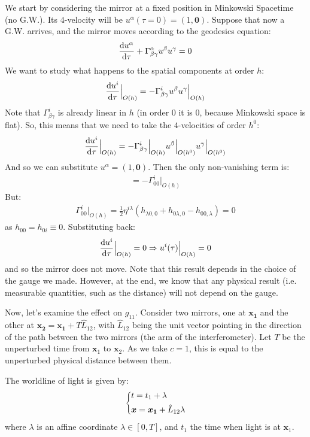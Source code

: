 \documentclass[../template.tex]{subfiles}
\begin{document}
We start by considering the mirror at a fixed position in Minkowski Spacetime (no G.W.). Its $4$-velocity will be $u^\alpha (\tau=0) = (1,\bm{0})$. Suppose that now a G.W. arrives, and the mirror moves according to the geodesics equation:
\begin{align*}
    \dv{u^\alpha}{\tau} + \Gamma^\alpha_{\beta \gamma} u^\beta u^\gamma = 0
\end{align*}
We want to study what happens to the spatial components at order $h$:
\begin{align*}
    \dv{u^i}{\tau}\Big|_{O(h)} = - \Gamma^i_{\beta \gamma}u^\beta u^\gamma \Big|_{O(h)}
\end{align*}
Note that $\Gamma^i_{\beta \gamma}$ is already linear in $h$ (in order $0$ it is $0$, because Minkowski space is flat). So, this means that we need to take the $4$-velocities of order $h^0$:
\begin{align*}
    \dv{u^i}{\tau}\Big|_{O(h)} = -\Gamma^i_{\beta \gamma}\Big|_{O(h)} u^\beta \Big|_{O(h^0)} u^\gamma \Big|_{O(h^0)}
\end{align*}
And so we can substitute $u^\alpha = (1,\bm{0})$. Then the only non-vanishing term is:
\begin{align*}
    = - \Gamma_{00}^i \Big|_{O(h)}
\end{align*}
But:
\begin{align*}
    \Gamma^i_{00} \Big|_{O(h)} = \frac{1}{2} \eta^{i \lambda} (h_{\lambda 0,0} + h_{0 \lambda,0}  - h_{00,\lambda}) = 0 
\end{align*}
as $h_{00} = h_{0i} \equiv 0$. Substituting back:
\begin{align*}
    \dv{u^i}{\tau}\Big|_{O(h)} = 0 \Rightarrow u^i(\tau) \Big|_{O(h)} = 0
\end{align*}
and so the mirror does not move. Note that this result depends in the choice of the gauge we made. However, at the end, we know that any physical result (i.e. measurable quantities, such as the distance) will not depend on the gauge.

\medskip

Now, let's examine the effect on $g_{11}$. Consider two mirrors, one at $\bm{x_1 }$ and the other at $\bm{x_2 } = \bm{x_1 } + T \hat{L}_{12}$, with $\hat{L}_{12}$ being the unit vector pointing in the direction of the path between the two mirrors (the arm of the interferometer). Let $T$ be the unperturbed time from $\bm{x}_1$ to $\bm{x}_2$. As we take $c=1$, this is equal to the unperturbed physical distance between them.

The worldline of light is given by:
\begin{align*}
    \begin{dcases}
        t = t_1 + \lambda\\
        \bm{x} = \bm{x_1} + \hat{L}_{12} \lambda
    \end{dcases}
\end{align*}
where $\lambda$ is an affine coordinate $\lambda \in [0,T]$, and $t_1$ the time when light is at $\bm{x}_1$. 
\end{document}
